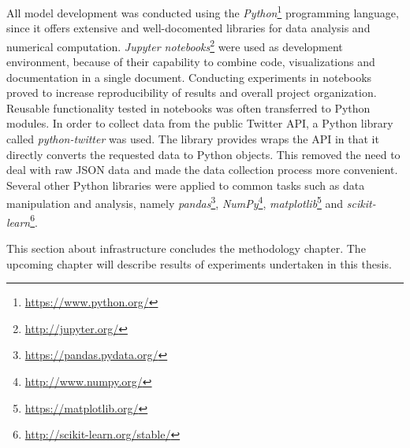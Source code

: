 All model development was conducted using the \textit{Python}\footnote{\url{https://www.python.org/}} programming language,
since it offers extensive and well-docomented libraries for data analysis and numerical computation.
\textit{Jupyter notebooks}\footnote{\url{http://jupyter.org/}} were used as development environment, because
of their capability to combine code, visualizations and documentation in a single
document.
Conducting experiments in notebooks proved to increase reproducibility of results
and overall project organization.
Reusable functionality tested in notebooks was often transferred to Python
modules.
In order to collect data from the public Twitter API, a Python library called
\textit{python-twitter} was used.
The library provides wraps the API in that it directly converts the requested
data to Python objects.
This removed the need to deal with raw JSON data and made the data collection
process more convenient.
Several other Python libraries were applied to common tasks such as data
manipulation and analysis, namely \textit{pandas}\footnote{\url{https://pandas.pydata.org/}},
\textit{NumPy}\footnote{\url{http://www.numpy.org/}},
\textit{matplotlib}\footnote{\url{https://matplotlib.org/}} and
\textit{scikit-learn}\footnote{\url{http://scikit-learn.org/stable/}}.



This section about infrastructure concludes the methodology chapter.
The upcoming chapter will describe results of experiments undertaken in this
thesis.

